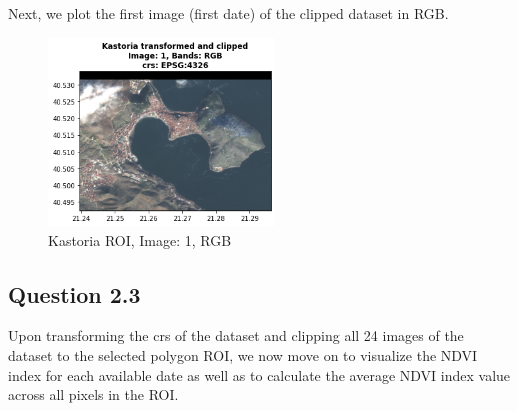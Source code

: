 Next, we plot the first image (first date) of the clipped dataset in RGB.

\begin{figure}[h]
    \centering
    \includegraphics[width=6cm]{figures/q2_2_ROI_clipped_RGB.png}
    \caption{Kastoria ROI, Image: 1, RGB}
    \label{fig:Kastoria ROI, Image: 1, RGB}
\end{figure}
\FloatBarrier %

\subsection{Question 2.3}
Upon transforming the crs of the dataset and clipping all 24 images of the dataset to the selected polygon ROI, we now move on to visualize the NDVI index for each available date as well as to calculate the average NDVI index value across all pixels in the ROI.

